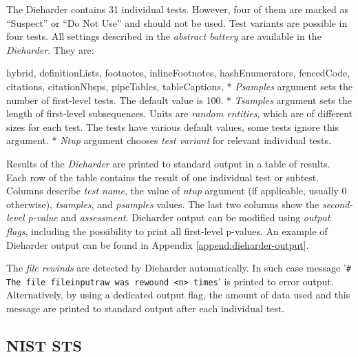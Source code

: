 \documentclass[
  digital,     %
  oneside,     %
  nosansbold,  %
  nocolorbold, %
  nolof,         %
  nolot,         %
]{fithesis4}
\begin{document}
The Dieharder contains 31 individual tests. However, four of them are marked as ``Suspect'' or ``Do Not Use'' and should not be used. Test variants are possible in four tests. All settings described in the \emph{abstract battery} are available in the \emph{Dieharder}. They are:
\begin{markdown*}{%
  hybrid,
  definitionLists,
  footnotes,
  inlineFootnotes,
  hashEnumerators,
  fencedCode,
  citations,
  citationNbsps,
  pipeTables,
  tableCaptions,
}
* \emph{Psamples} argument sets the number of first-level tests. The default value is 100.
* \emph{Tsamples} argument sets the length of first-level subsequences. Units are \emph{random entities}, which are of different sizes for each test. The tests have various default values, some tests ignore this argument.
* \emph{Ntup} argument chooses \emph{test variant} for relevant individual tests.

\end{markdown*}

Results of the \emph{Dieharder} are printed to standard output in a table of results. Each row of the table contains the result of one individual test or subtest. Columns describe \emph{test name}, the value of \emph{ntup} argument (if applicable, usually 0 otherwise), \emph{tsamples}, and \emph{psamples} values. The last two columns show the \emph{second-level p-value} and \emph{assessment}. Dieharder output can be modified using \emph{output flags}, including the possibility to print all first-level p-values. An example of Dieharder output can be found in Appendix \ref{append:dieharder-output}.

The \emph{file rewinds} are detected by Dieharder automatically. In such case message '\texttt{\# The file file\textunderscore input\textunderscore raw was rewound <n> times}' is printed to error output. Alternatively, by using a dedicated output flag, the amount of data used and this message are printed to standard output after each individual test.

\subsection{NIST STS} \label{chap:sols-nist}
\end{document}
